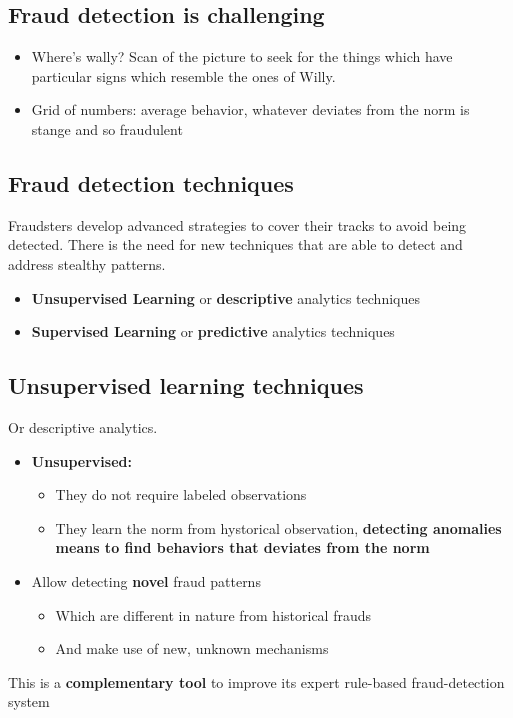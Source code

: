     \subsection{Fraud detection is challenging}
        \begin{itemize}
            \item Where's wally? Scan of the picture to seek for the things which have particular signs which resemble the ones of Willy.
            \item Grid of numbers: average behavior, whatever deviates from the norm is stange and so fraudulent 
        \end{itemize}
    \subsection{Fraud detection techniques}
        Fraudsters develop advanced strategies to cover their tracks to avoid being detected. There is the need for new techniques that are able to detect and address stealthy patterns.
        \begin{itemize}
            \item \textbf{Unsupervised Learning} or \textbf{descriptive} analytics techniques
            \item \textbf{Supervised Learning} or \textbf{predictive} analytics techniques
        \end{itemize}
    \subsection{Unsupervised learning techniques}
        Or descriptive analytics.
        \begin{itemize}
            \item \textbf{Unsupervised:}
            \begin{itemize}
                \item They do not require labeled observations
                \item They learn the norm from hystorical observation, \textbf{detecting anomalies means to find behaviors that deviates from the norm}
            \end{itemize}
            \item Allow detecting \textbf{novel} fraud patterns
            \begin{itemize}
                \item Which are different in nature from historical frauds 
                \item And make use of new, unknown mechanisms 
            \end{itemize}
        \end{itemize}
        This is a \textbf{complementary tool} to improve its expert rule-based fraud-detection system
\newpage
